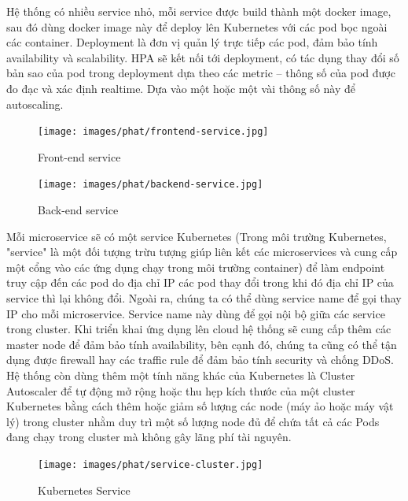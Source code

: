 \noindent Hệ thống có nhiều service nhỏ, mỗi service được build thành một docker image, sau đó dùng docker image này để deploy lên Kubernetes với các pod bọc ngoài các container. Deployment là đơn vị quản lý trực tiếp các pod, đảm bảo tính availability và scalability. HPA sẽ kết nối tới deployment, có tác dụng thay đổi số bản sao của pod trong deployment dựa theo các metric – thông số của pod được đo đạc và xác định realtime. Dựa vào một hoặc một vài thông số này để autoscaling.
 \begin{figure}[H]
    \begin{center}
    \texttt{[image: images/phat/frontend-service.jpg]}
    \vspace*{7mm}
    \caption{Front-end service}
    \end{center}
    \label{}
\end{figure}
 \begin{figure}[H]
    \begin{center}
    \texttt{[image: images/phat/backend-service.jpg]}
    \vspace*{7mm}
    \caption{Back-end service}
    \end{center}
    \label{}
\end{figure}

\noindent Mỗi microservice sẽ có một service Kubernetes (Trong môi trường Kubernetes, "service" là một đối tượng trừu tượng giúp liên kết các microservices và cung cấp một cổng vào các ứng dụng chạy trong môi trường container) để làm endpoint truy cập đến các pod do địa chỉ IP các pod thay đổi trong khi đó địa chỉ IP của service thì lại không đổi. Ngoài ra, chúng ta có thể dùng service name để gọi thay IP cho mỗi microservice. Service name này dùng để gọi nội bộ giữa các service trong cluster. Khi triển khai ứng dụng lên cloud hệ thống sẽ cung cấp thêm các master node để đảm bảo tính availability, bên cạnh đó, chúng ta cũng có thể tận dụng được firewall hay các traffic rule để đảm bảo tính security và chống DDoS.\\[0.5cm]
\noindent Hệ thống còn dùng thêm một tính năng khác của Kubernetes là Cluster Autoscaler để tự động mở rộng hoặc thu hẹp kích thước của một cluster Kubernetes bằng cách thêm hoặc giảm số lượng các node (máy ảo hoặc máy vật lý) trong cluster nhằm duy trì một số lượng node đủ để chứa tất cả các Pods đang chạy trong cluster mà không gây lãng phí tài nguyên.
 \begin{figure}[H]
    \begin{center}
    \texttt{[image: images/phat/service-cluster.jpg]}
    \vspace*{7mm}
    \caption{Kubernetes Service}
    \end{center}
    \label{}
\end{figure}
